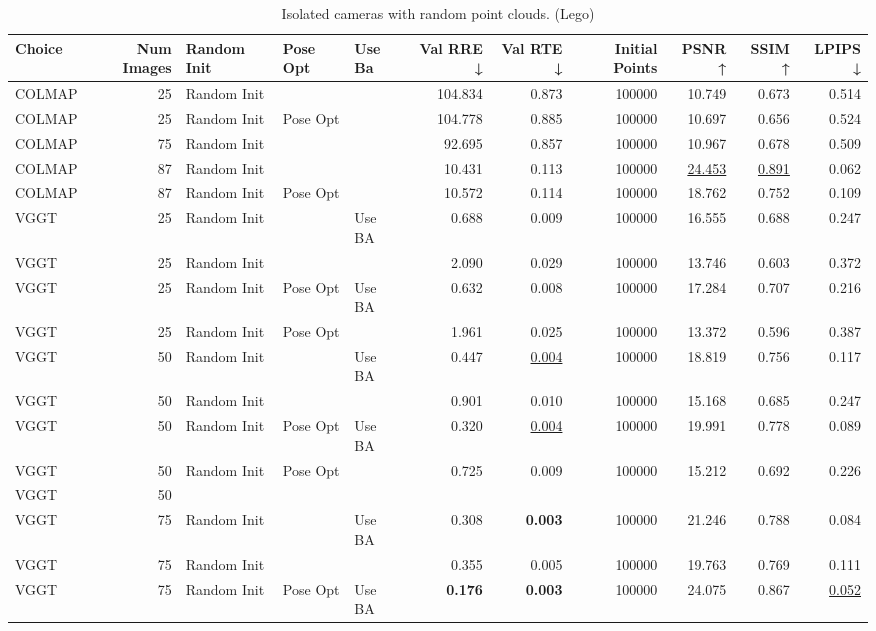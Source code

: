 \begin{table}[H]
\caption{Isolated cameras with random point clouds. (Lego)}
\label{tab:06_isolated_cams_num_points_lego}
\small
\begin{tabular}{lrlllrrrrrr}
\toprule
Choice & Num Images & Random Init & Pose Opt & Use Ba & Val RRE ↓ & Val RTE ↓ & Initial Points & PSNR ↑ & SSIM ↑ & LPIPS ↓ \\
\midrule
COLMAP & 25 & Random Init &  &  & 104.834 & 0.873 & 100000 & 10.749 & 0.673 & 0.514 \\
COLMAP & 25 & Random Init & Pose Opt &  & 104.778 & 0.885 & 100000 & 10.697 & 0.656 & 0.524 \\
COLMAP & 75 & Random Init &  &  & 92.695 & 0.857 & 100000 & 10.967 & 0.678 & 0.509 \\
COLMAP & 87 & Random Init &  &  & 10.431 & 0.113 & 100000 & \underline{24.453} & \underline{0.891} & 0.062 \\
COLMAP & 87 & Random Init & Pose Opt &  & 10.572 & 0.114 & 100000 & 18.762 & 0.752 & 0.109 \\
VGGT & 25 & Random Init &  & Use BA & 0.688 & 0.009 & 100000 & 16.555 & 0.688 & 0.247 \\
VGGT & 25 & Random Init &  &  & 2.090 & 0.029 & 100000 & 13.746 & 0.603 & 0.372 \\
VGGT & 25 & Random Init & Pose Opt & Use BA & 0.632 & 0.008 & 100000 & 17.284 & 0.707 & 0.216 \\
VGGT & 25 & Random Init & Pose Opt &  & 1.961 & 0.025 & 100000 & 13.372 & 0.596 & 0.387 \\
VGGT & 50 & Random Init &  & Use BA & 0.447 & \underline{0.004} & 100000 & 18.819 & 0.756 & 0.117 \\
VGGT & 50 & Random Init &  &  & 0.901 & 0.010 & 100000 & 15.168 & 0.685 & 0.247 \\
VGGT & 50 & Random Init & Pose Opt & Use BA & 0.320 & \underline{0.004} & 100000 & 19.991 & 0.778 & 0.089 \\
VGGT & 50 & Random Init & Pose Opt &  & 0.725 & 0.009 & 100000 & 15.212 & 0.692 & 0.226 \\
VGGT & 50 &  &  &  &  &  &  &  &  &  \\
VGGT & 75 & Random Init &  & Use BA & 0.308 & \textbf{0.003} & 100000 & 21.246 & 0.788 & 0.084 \\
VGGT & 75 & Random Init &  &  & 0.355 & 0.005 & 100000 & 19.763 & 0.769 & 0.111 \\
VGGT & 75 & Random Init & Pose Opt & Use BA & \textbf{0.176} & \textbf{0.003} & 100000 & 24.075 & 0.867 & \underline{0.052} \\

\end{tabular}
\end{table}
